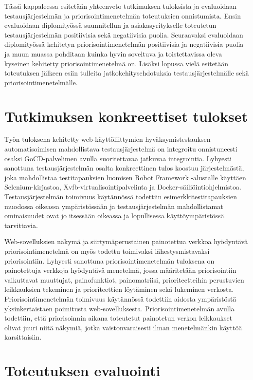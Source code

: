 Tässä kappaleessa esitetään yhteenveto tutkimuksen tuloksista ja evaluoidaan testausjärjestelmän ja priorisointimenetelmän toteutuksien onnistumista.
Ensin evaluoidaan diplomityössä suunnitellun ja asiakasyritykselle toteutetun testausjärjestelmän positiivisia sekä negatiivisia puolia.
Seuraavaksi evaluoidaan diplomityössä kehitetyn priorisointimenetelmän positiivisia ja negatiivisia puolia ja muun muassa pohditaan kuinka hyvin soveltuva ja toistettavissa oleva kyseinen kehitetty priorisointimenetelmä on.
Lisäksi lopussa vielä esitetään toteutuksen jälkeen esiin tulleita jatkokehitysehdotuksia testausjärjestelmälle sekä priorisointimenetelmälle.

\section{Tutkimuksen konkreettiset tulokset} \label{ch:12_tutkimuksen_konkreettiset_tulokset}

  Työn tuloksena kehitetty  web-käyttöliittymien hyväksymistestauksen automatisoimisen mahdollistava testausjärjestelmä on integroitu onnistuneesti osaksi GoCD-palvelimen avulla suoritettavaa jatkuvaa integrointia.
  Lyhyesti sanottuna testausjärjestelmän osalta konkreettinen tulos koostuu järjestelmästä, joka mahdollistaa testitapauksien luomisen Robot Framework -alustalle käyttäen Selenium-kirjastoa, Xvfb-virtualisointipalvelinta ja Docker-säiliöintiohjelmistoa.
  Testausjärjestelmän toimivuus käytännössä todettiin esimerkkitestitapauksien muodossa oikeassa ympäristössään ja testausjärjestelmän mahdollistamat ominaisuudet ovat jo itsessään oikeassa ja lopullisessa käyttöympäristössä tarvittavia.

  Web-sovelluksien näkymä ja siirtymäperustainen painotettua verkkoa hyödyntävä priorisointimenetelmä on myös todettu toimivaksi lähestysmistavaksi priorisointiin.
  Lyhyesti sanottuna priorisointimenetelmän tuloksena on painotettuja verkkoja hyödyntävä menetelmä, jossa määritetään priorisointiin vaikuttavat muuttujat, painofunktiot, painomatriisi, prioriteetteihin perustuvien leikkauksien tekeminen ja prioriteettien löytäminen sekä lukeminen verkosta.
  Priorisointimenetelmän toimivuus käytännössä todettiin aidosta ympäristöstä yksinkertaistaen poimitusta web-sovelluksesta.
  Priorisointimenetelmän avulla todettiin, että priorisoinnin aikana toteutetut painotetun verkon leikkaukset olivat juuri niitä näkymiä, jotka vaistonvaraisesti ilman menetelmänkin käyttöä karsittaisiin.

\section{Toteutuksen evaluointi} \label{ch:12_toteutuksen_evaluointi}

